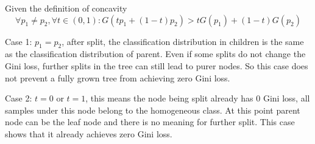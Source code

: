 \begin{answer}

Given the definition of concavity
\begin{equation}
        \forall p_1 \neq p_2, \forall t \in (0, 1): G(t p_1 + (1 - t) p_2) > t G(p_1) + (1 - t) G(p_2)
\end{equation}

Case 1: $p_1 = p_2$, after split, the classification distribution in children is the same as the classification distribution of parent. Even if some splits do not change the Gini loss, further splits in the tree can still lead to purer nodes. So this case does not prevent a fully grown tree from achieving zero Gini loss.

Case 2: $t = 0$ or $t = 1$, this means the node being split already has 0 Gini loss, all samples under this node belong to the homogeneous class. At this point parent node can be the leaf node and there is no meaning for further split. This case shows that it already achieves zero Gini loss.

\end{answer}